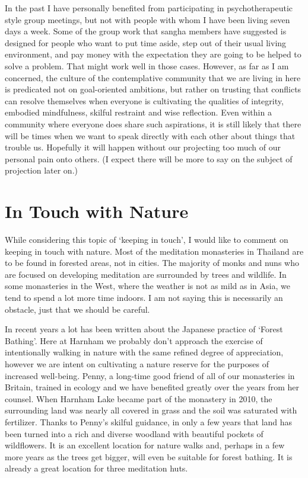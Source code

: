 In the past I have personally benefited from participating in
psychotherapeutic style group meetings, but not with people with whom I
have been living seven days a week. Some of the group work that sangha
members have suggested is designed for people who want to put time
aside, step out of their usual living environment, and pay money with
the expectation they are going to be helped to solve a problem. That
might work well in those cases. However, as far as I am concerned, the culture of the
contemplative community that we are living in here is predicated not on
goal-oriented ambitions, but rather on trusting that conflicts can
resolve themselves when everyone is cultivating the qualities of integrity, embodied mindfulness, skilful restraint and wise reflection. Even within
a community where everyone does share such aspirations, it is still
likely that there will be times when we want to speak directly with each
other about things that trouble us. Hopefully it will happen without our
projecting too much of our personal pain onto others. (I expect there will be more
to say on the subject of projection later on.)

\section{In Touch with Nature}

While considering this topic of `keeping in touch', I would like to
comment on keeping in touch with nature. Most of the meditation
monasteries in Thailand are to be found in forested areas, not in
cities. The majority of monks and nuns who are focused on developing
meditation are surrounded by trees and wildlife. In some monasteries in
the West, where the weather is not as mild as in Asia, we tend to spend
a lot more time indoors. I am not saying this is necessarily an
obstacle, just that we should be careful.

In recent years a lot has been written about the Japanese practice of `Forest
Bathing'\cite{bathing}. Here at Harnham we probably don't approach the
exercise of intentionally walking in nature with the same refined degree
of appreciation, however we are intent on cultivating a nature reserve
for the purposes of increased well-being. Penny, a long-time good friend
of all of our monasteries in Britain, trained in ecology and we have
benefited greatly over the years from her counsel. When Harnham Lake
became part of the monastery in 2010, the surrounding land was nearly
all covered in grass and the soil was saturated with fertilizer. Thanks
to Penny's skilful guidance, in only a few years that land has been
turned into a rich and diverse woodland with beautiful pockets of
wildflowers. It is an excellent location for nature walks and, perhaps
in a few more years as the trees get bigger, will even be suitable for
forest bathing. It is already a great location for three meditation
huts.

